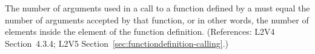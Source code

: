 The number of arguments used in a call to a function defined by a
\FunctionDefinition must equal the number of arguments accepted by that
function, or in other words, the number of  elements inside the
 element of the function definition.  (References: L2V4 Section~4.3.4; L2V5 Section~\ref{sec:functiondefinition-calling}.)

